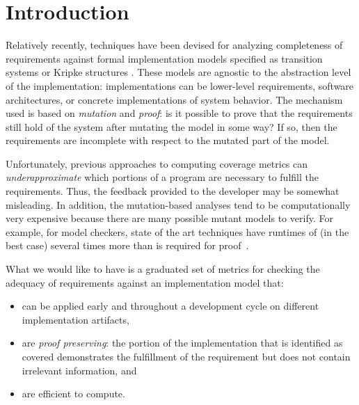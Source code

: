 \section{Introduction}
\label{sec:intro}
%

Relatively recently, techniques have been devised for analyzing completeness of requirements against formal implementation models specified as transition systems or Kripke structures \cite{chockler2001practical,das2005formal, claessen2007coverage, grosse2007estimating}.  These models are agnostic to the abstraction level of the implementation: implementations can be lower-level requirements, software architectures, or concrete implementations of system behavior.  The mechanism used is based on {\em mutation} and {\em proof}: is it possible to prove that the requirements still hold of the system after mutating the model in some way?  If so, then the requirements are incomplete with respect to the mutated part of the model.

Unfortunately, previous approaches to computing coverage metrics can {\em underapproximate} which portions of a program are necessary to fulfill the requirements. Thus, the feedback provided to the developer may be somewhat misleading.
In addition, the mutation-based analyses tend to be computationally very expensive because there are many possible mutant models to verify.  For example, for model checkers, state of the art techniques have runtimes of (in the best case) several times more than is required for proof~\cite{chockler2010coverage}.

What we would like to have is a graduated set of metrics for checking the adequacy of requirements against an implementation model that:
\begin{itemize}
    \item can be applied early and throughout a development cycle on different implementation artifacts,
    \item are {\em proof preserving}: the portion of the implementation that is identified as covered demonstrates the
        fulfillment of the requirement but does not contain irrelevant information, and
    \item are efficient to compute.
\end{itemize}

